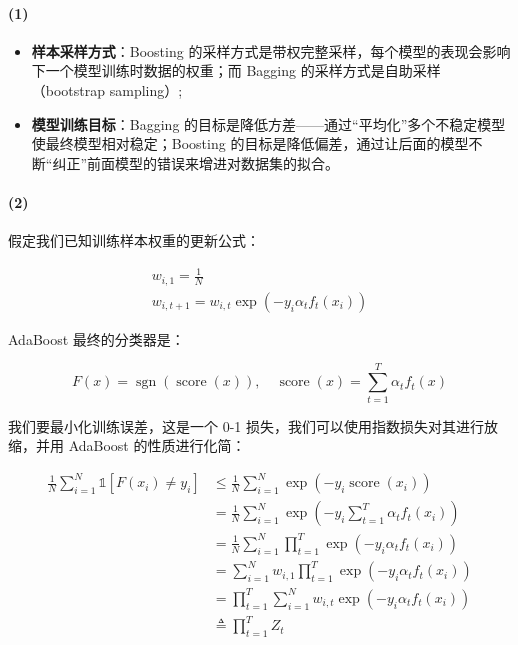 \documentclass{ctexart}
\begin{document}
\paragraph{(1)}\label{section-14}

\begin{itemize}

\item
  \textbf{样本采样方式}：Boosting
  的采样方式是带权完整采样，每个模型的表现会影响下一个模型训练时数据的权重；而
  Bagging 的采样方式是自助采样（bootstrap sampling）;
\item
  \textbf{模型训练目标}：Bagging
  的目标是降低方差------通过``平均化''多个不稳定模型使最终模型相对稳定；Boosting
  的目标是降低偏差，通过让后面的模型不断``纠正''前面模型的错误来增进对数据集的拟合。
\end{itemize}

\paragraph{(2)}\label{section-15}

假定我们已知训练样本权重的更新公式：


\begin{gather*}
w_{i,1} = \frac{1}{N}\\
w_{i,t+1} = w_{i,t} \exp\left(-y_i\alpha_tf_t(x_i)\right)
\end{gather*}


AdaBoost 最终的分类器是：

\begin{equation*}
F(x)=\operatorname{sgn}(\operatorname{score}(x)),\quad \operatorname{score}(x) = \sum_{t=1}^T\alpha_tf_t(x)
\end{equation*}

我们要最小化训练误差，这是一个 0-1
损失，我们可以使用指数损失对其进行放缩，并用 AdaBoost 的性质进行化简：


\begin{equation*}
\begin{aligned}
\frac{1}{N}\sum_{i=1}^N\mathbb 1[F(x_i)\ne y_i] &\le \frac{1}{N}\sum_{i=1}^N\exp(-y_i\operatorname{score}(x_i)) \\
&=\frac{1}{N}\sum_{i=1}^N\exp\left(-y_i\sum_{t=1}^T\alpha_tf_t(x_i)\right) \\
&= \frac1N\sum_{i=1}^N\prod_{t=1}^T\exp\left(-y_i\alpha_tf_t(x_i)\right) \\
&= \sum_{i=1}^Nw_{i,1}\prod_{t=1}^T\exp\left(-y_i\alpha_tf_t(x_i)\right)\\
&= \prod_{t=1}^T\sum_{i=1}^Nw_{i,t}\exp\left(-y_i\alpha_tf_t(x_i)\right)\\
&\triangleq \prod_{t=1}^TZ_t
\end{aligned}
\end{equation*}
\end{document}

